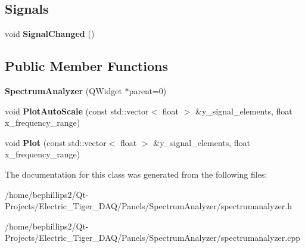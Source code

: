 \subsection*{Signals}
\begin{DoxyCompactItemize}
\item 
void {\bfseries Signal\+Changed} ()\hypertarget{class_spectrum_analyzer_afcbb7dc1848df0eb7d43160e489b8855}{}\label{class_spectrum_analyzer_afcbb7dc1848df0eb7d43160e489b8855}

\end{DoxyCompactItemize}
\subsection*{Public Member Functions}
\begin{DoxyCompactItemize}
\item 
{\bfseries Spectrum\+Analyzer} (Q\+Widget $\ast$parent=0)\hypertarget{class_spectrum_analyzer_aef258c587abbeb0b11cb765e5aeee636}{}\label{class_spectrum_analyzer_aef258c587abbeb0b11cb765e5aeee636}

\item 
void {\bfseries Plot\+Auto\+Scale} (const std\+::vector$<$ float $>$ \&y\+\_\+signal\+\_\+elements, float x\+\_\+frequency\+\_\+range)\hypertarget{class_spectrum_analyzer_a065ff36f268a12550ee3ca7fc0309e34}{}\label{class_spectrum_analyzer_a065ff36f268a12550ee3ca7fc0309e34}

\item 
void {\bfseries Plot} (const std\+::vector$<$ float $>$ \&y\+\_\+signal\+\_\+elements, float x\+\_\+frequency\+\_\+range)\hypertarget{class_spectrum_analyzer_a3fa614a77514275af0b0b82fbdd712a8}{}\label{class_spectrum_analyzer_a3fa614a77514275af0b0b82fbdd712a8}

\end{DoxyCompactItemize}


The documentation for this class was generated from the following files\+:\begin{DoxyCompactItemize}
\item 
/home/bephillips2/\+Qt-\/\+Projects/\+Electric\+\_\+\+Tiger\+\_\+\+D\+A\+Q/\+Panels/\+Spectrum\+Analyzer/spectrumanalyzer.\+h\item 
/home/bephillips2/\+Qt-\/\+Projects/\+Electric\+\_\+\+Tiger\+\_\+\+D\+A\+Q/\+Panels/\+Spectrum\+Analyzer/spectrumanalyzer.\+cpp\end{DoxyCompactItemize}
